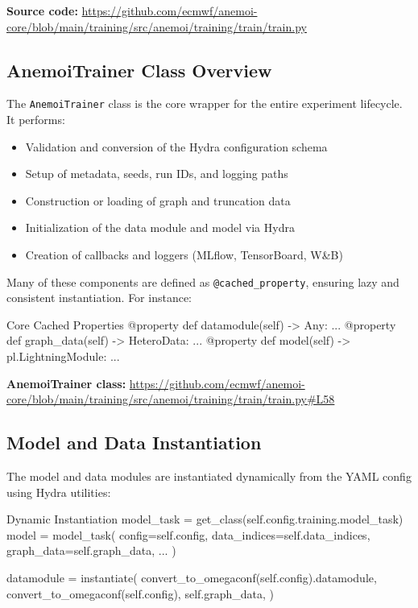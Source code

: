 {\bf Source code:} \url{https://github.com/ecmwf/anemoi-core/blob/main/training/src/anemoi/training/train/train.py}

%
\subsection{AnemoiTrainer Class Overview}

The \texttt{AnemoiTrainer} class is the core wrapper for the entire experiment lifecycle. It performs:

\begin{itemize}
  \item Validation and conversion of the Hydra configuration schema
  \item Setup of metadata, seeds, run IDs, and logging paths
  \item Construction or loading of graph and truncation data
  \item Initialization of the data module and model via Hydra
  \item Creation of callbacks and loggers (MLflow, TensorBoard, W\&B)
\end{itemize}

Many of these components are defined as \texttt{@cached\_property}, ensuring lazy and consistent instantiation. For instance:

\begin{codeonly}{Core Cached Properties}
@property
def datamodule(self) -> Any: ...
@property
def graph_data(self) -> HeteroData: ...
@property
def model(self) -> pl.LightningModule: ...
\end{codeonly}

{\bf AnemoiTrainer class:} \url{https://github.com/ecmwf/anemoi-core/blob/main/training/src/anemoi/training/train/train.py#L58}

%
\subsection{Model and Data Instantiation}

The model and data modules are instantiated dynamically from the YAML config using Hydra utilities:

\begin{codeonly}{Dynamic Instantiation}
model_task = get_class(self.config.training.model_task)
model = model_task(
    config=self.config,
    data_indices=self.data_indices,
    graph_data=self.graph_data,
    ...
)

datamodule = instantiate(
    convert_to_omegaconf(self.config).datamodule,
    convert_to_omegaconf(self.config),
    self.graph_data,
)
\end{codeonly}

